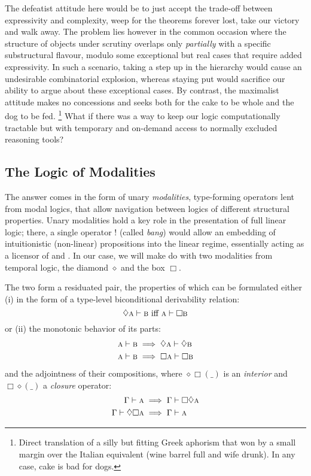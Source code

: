 The defeatist attitude here would be to just accept the trade-off between expressivity and complexity, weep for the theorems forever lost, take our victory and walk away.
The problem lies however in the common occasion where the structure of objects under scrutiny overlaps only \textit{partially} with a specific substructural flavour, modulo some exceptional but real cases that require added expressivity.
In such a scenario, taking a step up in the hierarchy would cause an undesirable combinatorial explosion, whereas staying put would sacrifice our ability to argue about these exceptional cases. 
By contrast, the maximalist attitude makes no concessions and seeks both for the cake to be whole and the dog to be fed.%
\footnote{Direct translation of a silly but fitting Greek aphorism that won by a small margin over the Italian equivalent (wine barrel full and wife drunk). In any case, cake is bad for dogs.}
What if there was a way to keep our logic computationally tractable but with temporary and on-demand access to normally excluded reasoning tools?

\subsection{The Logic of Modalities}\label{subsec:modal_logic}
The answer comes in the form of unary \textit{modalities}, type-forming operators lent from modal logics, that allow navigation between logics of different structural properties.
Unary modalities hold a key role in the presentation of full linear logic; there, a single operator $!$ (called \textit{bang}) would allow an embedding of intuitionistic (non-linear) propositions into the linear regime, essentially acting as a licensor of \Contraction{} and \Weakening{}.
In our case, we will make do with two modalities from temporal logic, the diamond $\diamond$ and the box $\Box$.

The two form a residuated pair, the properties of which can be formulated either (i) in the form of a type-level biconditional derivability relation:
\begin{equation}
		\diamond \prop{a} \vdash \prop{b}\text{ iff }\prop{a} \vdash \Box\prop{b}
\end{equation}
or (ii) the monotonic behavior of its parts:
\begin{align}
		\prop{a} \vdash \prop{b} & \implies \diamond \prop{a}\vdash \diamond\prop{b}\\
		\prop{a} \vdash \prop{b} & \implies \Box{\prop{a}}\vdash \Box\prop{b}
\end{align}
and the adjointness of their compositions, where $\diamond\Box(\_)$ is an \textit{interior} and $\Box\diamond(\_)$ a \textit{closure} operator:
\begin{align}
		\Gamma \vdash \prop{a} 				& \implies \Gamma \vdash \Box\diamond\prop{a} \label{equation:closure}\\
		\Gamma \vdash \diamond\Box\prop{a} & \implies \Gamma \vdash \prop{a} \label{equation:interior}
\end{align}

